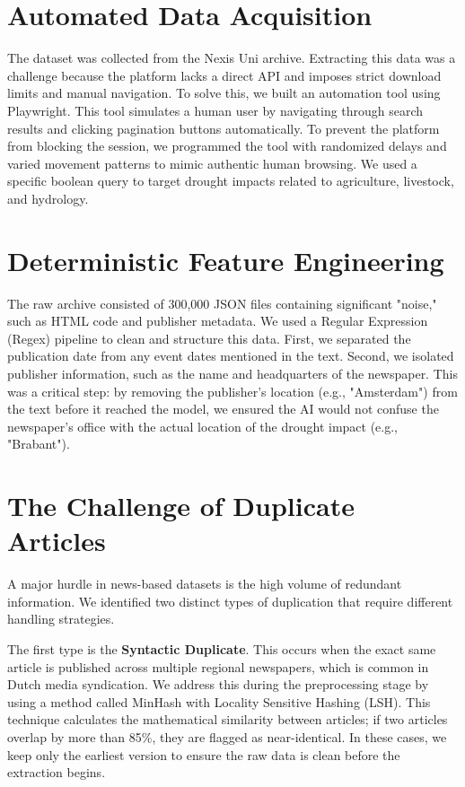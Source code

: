 \section{Automated Data Acquisition}

The dataset was collected from the Nexis Uni archive. Extracting this data was a challenge because the platform lacks a direct API and imposes strict download limits and manual navigation. To solve this, we built an automation tool using Playwright. This tool simulates a human user by navigating through search results and clicking pagination buttons automatically. To prevent the platform from blocking the session, we programmed the tool with randomized delays and varied movement patterns to mimic authentic human browsing. We used a specific boolean query to target drought impacts related to agriculture, livestock, and hydrology.

\section{Deterministic Feature Engineering}

The raw archive consisted of 300,000 JSON files containing significant "noise," such as HTML code and publisher metadata. We used a Regular Expression (Regex) pipeline to clean and structure this data. First, we separated the publication date from any event dates mentioned in the text. Second, we isolated publisher information, such as the name and headquarters of the newspaper. This was a critical step: by removing the publisher's location (e.g., "Amsterdam") from the text before it reached the model, we ensured the AI would not confuse the newspaper's office with the actual location of the drought impact (e.g., "Brabant").

\section{The Challenge of Duplicate Articles}

A major hurdle in news-based datasets is the high volume of redundant information. We identified two distinct types of duplication that require different handling strategies.

The first type is the \textbf{Syntactic Duplicate}. This occurs when the exact same article is published across multiple regional newspapers, which is common in Dutch media syndication. We address this during the preprocessing stage by using a method called MinHash with Locality Sensitive Hashing (LSH). This technique calculates the mathematical similarity between articles; if two articles overlap by more than 85\%, they are flagged as near-identical. In these cases, we keep only the earliest version to ensure the raw data is clean before the extraction begins.

